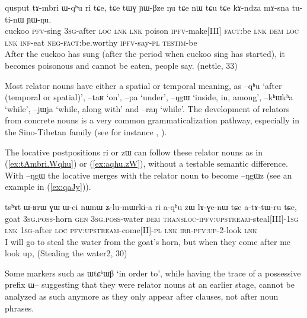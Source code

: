 \documentclass[oldfontcommands,oneside,a4paper,11pt]{article}
\newcommand{\ipa}[1]{{\phon \mbox{#1}}} %
\newcommand{\refb}[1]{(\ref{#1})}
\begin{document}
 \begin{exe}
\ex \label{ex:tAmbri.Wqhu} 
\gll 
\ipa{qusput}  	\ipa{tɤ-mbri}  	\ipa{ɯ-qʰu}  	\ipa{ri}  	\ipa{tɕe,}  	\ipa{tɕe}  	\ipa{tɯɣ}  	\ipa{ɲɯ-βze}  	\ipa{ŋu}  	\ipa{tɕe}  	\ipa{nɯ} \ipa{tɕu}  	\ipa{tɕe}  	\ipa{kɤ-ndza}  	\ipa{mɤ-sna}  	\ipa{tu-ti-nɯ}  	\ipa{ɲɯ-ŋu.}  \\
cuckoo \textsc{pfv}-sing \textsc{3sg}-after \textsc{loc} \textsc{lnk} \textsc{lnk} poison \textsc{ipfv}-make[III] \textsc{fact}:be \textsc{lnk}  \textsc{dem} \textsc{loc} \textsc{lnk} \textsc{inf}-eat \textsc{neg-fact}:be.worthy \textsc{ipfv}-say-\textsc{pl} \textsc{testim}-be \\
\glt After the cuckoo has sung (after the period when cuckoo sing has started), it becomes poisonous and cannot be eaten, people say. (nettle, 33)
\end{exe}

Most relator nouns have either a spatial or temporal meaning, as \ipa{--qʰu} `after (temporal or spatial)',  \ipa{--taʁ} `on',  \ipa{--pa} `under',  \ipa{--ŋgɯ} `inside, in, among', \ipa{--kʰɯkʰa} `while', \ipa{--jɯja} `while, along with' and \ipa{--raŋ} `while'. The development of relators from concrete nouns is a very common grammaticalization pathway, especially in the Sino-Tibetan family (see for instance \citealt{delancey97relator}, \citealt[184]{coupe07mongsen}).

The locative postpositions \ipa{ri} or \ipa{zɯ} can follow these relator nouns as in \refb{ex:tAmbri.Wqhu}  or \refb{ex:aqhu.zW}, without a testable semantic difference. With \ipa{--ŋgɯ} the  locative merges with the relator noun to  become \ipa{--ŋgɯz} (see an example in \refb{ex:qaJy}).

 \begin{exe}
\ex \label{ex:aqhu.zW} 
\gll
\ipa{tsʰɤt}  	\ipa{ɯ-ʁrɯ}  	\ipa{ɣɯ}  	\ipa{ɯ-ci}  	\ipa{nɯnɯ}  	\ipa{ʑ-lu-mɯrki-a}  	\ipa{ri}  	\ipa{a-qʰu}  	\ipa{zɯ}  	\ipa{lɤ-ɣe-nɯ}  	\ipa{tɕe}  \ipa{a-tɤ-tɯ-ru}  	\ipa{tɕe,}  \\
goat \textsc{3sg.poss}-horn \textsc{gen} \textsc{3sg.poss}-water \textsc{dem}  \textsc{transloc-ipfv:upstream}-steal[III]-\textsc{1sg} \textsc{lnk} \textsc{1sg}-after \textsc{loc} \textsc{pfv:upstream}-come[II]-\textsc{pl} \textsc{lnk} \textsc{irr-pfv:up}-2-look \textsc{lnk} \\
\glt I will go to steal the water from the goat's horn, but when they come after me look up, (Stealing the water2, 30)
\end{exe}

Some markers such as  \ipa{ɯtɕʰɯβ} `in order to', while having the trace of a possessive prefix \ipa{ɯ--} suggesting that they were relator nouns at an earlier stage, cannot be analyzed as such anymore as they only appear after clauses, not after noun phrases.
\end{document}
